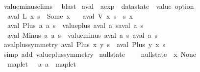 \begin{isabellebody}
\ value{\isacharunderscore}minus{\isachardot}elims\ \isamarkupfalse%
\ blast%
\endisatagproof
{\isafoldproof}%
%
\isadelimproof
\isanewline
%
\endisadelimproof
\isanewline
{}\isamarkupfalse%
\ aval\ {\isacharcolon}{\isacharcolon}\ {\isachardoublequoteopen}aexp\ {\isasymRightarrow}\ datastate\ {\isasymRightarrow}\ value\ option{\isachardoublequoteclose}\ \isanewline
\ \ {\isachardoublequoteopen}aval\ {\isacharparenleft}L\ x{\isacharparenright}\ s\ {\isacharequal}\ Some\ x{\isachardoublequoteclose}\ {\isacharbar}\isanewline
\ \ {\isachardoublequoteopen}aval\ {\isacharparenleft}V\ x{\isacharparenright}\ s\ {\isacharequal}\ s\ x{\isachardoublequoteclose}\ {\isacharbar}\isanewline
\ \ {\isachardoublequoteopen}aval\ {\isacharparenleft}Plus\ a\ a\ s\ {\isacharequal}\ value{\isacharunderscore}plus\ {\isacharparenleft}aval\ a\ s{\isacharparenright}{\isacharparenleft}aval\ a\ s{\isacharparenright}{\isachardoublequoteclose}\ {\isacharbar}\isanewline
\ \ {\isachardoublequoteopen}aval\ {\isacharparenleft}Minus\ a\ a\ s\ {\isacharequal}\ value{\isacharunderscore}minus\ {\isacharparenleft}aval\ a\ s{\isacharparenright}\ {\isacharparenleft}aval\ a\ s{\isacharparenright}{\isachardoublequoteclose}\isanewline
\isanewline
{}\isamarkupfalse%
\ aval{\isacharunderscore}plus{\isacharunderscore}symmetry{\isacharcolon}\ {\isachardoublequoteopen}aval\ {\isacharparenleft}Plus\ x\ y{\isacharparenright}\ s\ {\isacharequal}\ aval\ {\isacharparenleft}Plus\ y\ x{\isacharparenright}\ s{\isachardoublequoteclose}\isanewline
%
\isadelimproof
\ \ %
\endisadelimproof
%
\isatagproof
{}\isamarkupfalse%
\ {\isacharparenleft}simp\ add{\isacharcolon}\ value{\isacharunderscore}plus{\isacharunderscore}symmetry{\isacharparenright}%
\endisatagproof
{\isafoldproof}%
%
\isadelimproof
\isanewline
%
\endisadelimproof
\isanewline
{}\isamarkupfalse%
\ null{\isacharunderscore}state\ {\isacharparenleft}{\isachardoublequoteopen}{\isacharless}{\isachargreater}{\isachardoublequoteclose}{\isacharparenright}\ \isanewline
\ \ {\isachardoublequoteopen}null{\isacharunderscore}state\ {\isasymequiv}\ {\isasymlambda}x{\isachardot}\ None{\isachardoublequoteclose}\isanewline
\isanewline
{}\isamarkupfalse%
\isanewline
\ \ {\isachardoublequoteopen}{\isacharunderscore}maplet{\isachardoublequoteclose}\ \ {\isacharcolon}{\isacharcolon}\ {\isachardoublequoteopen}{\isacharbrackleft}{\isacharprime}a{\isacharcomma}\ {\isacharprime}a{\isacharbrackright}\ {\isasymRightarrow}\ maplet{\isachardoublequoteclose}\ \ \ \ \ \ \ \ \ \ \ \ \ {\isacharparenleft}{\isachardoublequoteopen}{\isacharunderscore}\ {\isacharslash}{\isacharcolon}{\isacharequal}{\isacharslash}\ {\isacharunderscore}{\isachardoublequoteclose}{\isacharparenright}\isanewline

\end{isabellebody}

